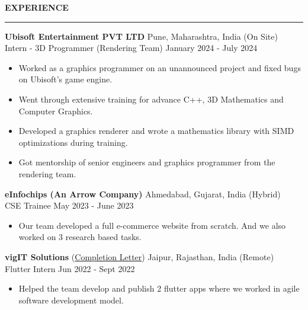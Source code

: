 \documentclass[a4paper, 11pt]{article}
\newenvironment{resumeSection}[1]
{
    \MakeUppercase{\Large\textbf{#1}}
    \medskip
    \hrule
    \begin{list}{}
    {
        \setlength\itemsep{-0.3em}
        \setlength\leftmargin{0em}
    }
    \vspace{-1em}
    \item[]
}
{   \end{list}  }
\newenvironment{sectionItems}
{
    \vspace{-0.5em}
    \begin{itemize}
    \setlength{\itemsep}{-0.7em}
}
{
    \end{itemize}
}
\begin{document}
\medskip
\begin{resumeSection}{Experience}
    \item
    \textbf{Ubisoft Entertainment PVT LTD}
    \hfill
    Pune, Maharashtra, India (On Site)
    \\
    Intern - 3D Programmer (Rendering Team)
    \hfill
    January 2024 - July 2024
    
    \begin{sectionItems}
        \item Worked as a graphics programmer on an unannounced project and fixed bugs on Ubisoft's game engine.
        \item Went through extensive training for advance C++, 3D Mathematics and Computer Graphics.
        \item Developed a graphics renderer and wrote a mathematics library with SIMD optimizations during training.
        \item Got mentorship of senior engineers and graphics programmer from the rendering team.
    \end{sectionItems}
    
    \item
    \textbf{eInfochips (An Arrow Company)}
    \hfill
    Ahmedabad, Gujarat, India (Hybrid)
    \\
    CSE Trainee
    \hfill
    May 2023 - June 2023
    
    \begin{sectionItems}
        \item Our team developed a full e-commerce website from scratch. And we also worked on 3 research based tasks.
    \end{sectionItems}
    
    \item 
    \textbf{vigIT Solutions} (\href{https://drive.google.com/file/d/1yF5baJ-uIWpwAHL0Sd-CwycYHjbyFumW/view?usp=sharing}{Completion Letter})
    \hfill
    Jaipur, Rajasthan, India (Remote)
    \\
    Flutter Intern
    \hfill
    Jun 2022 - Sept 2022
    
    \begin{sectionItems}
        \item Helped the team develop and publish 2 flutter apps where we worked in agile software development model.
    \end{sectionItems}
    
\end{resumeSection}
\end{document}
